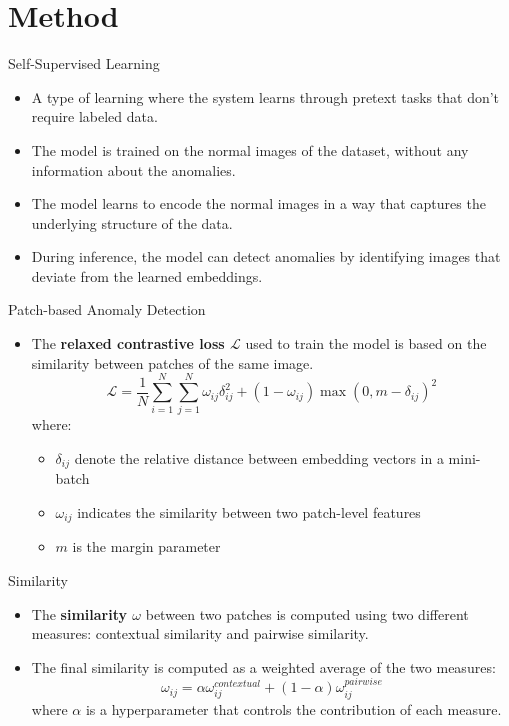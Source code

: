 \documentclass{beamer}
\begin{document}
\section{Method}
\begin{frame}{Self-Supervised Learning}
      \begin{itemize}
          \item A type of learning where the system learns through
           pretext tasks that don't require labeled data.
              \item The model is trained on the normal images of the dataset, without
               any information about the anomalies.
                  \item The model learns to encode the normal images in a way that
                   captures the underlying structure of the data.
                      \item During inference, the model can detect anomalies by
                       identifying images that deviate from the learned embeddings.
          \end{itemize}
  \end{frame}
\begin{frame}{Patch-based Anomaly Detection}
      \begin{itemize}
          \item The \textbf{relaxed contrastive loss $\mathcal{L}$} used to train the model is based on the similarity
           between patches of the same image.
           \begin{equation} \mathcal{L} = \frac{1}{N}\sum_{i=1}^{N} \sum_{j=1}^{N} 
            \omega_{ij}\delta_{ij}^2 + (1 - \omega_{ij})\max(0, m - \delta_{ij})^2
      \end{equation}
      where:
      \begin{itemize}
      \item $\delta_{ij}$ denote the relative distance between embedding vectors in a mini-batch
      \item $\omega_{ij}$ indicates the similarity between two patch-level features
      \item $m$ is the margin parameter
\end{itemize}
\end{itemize}
\end{frame}
\begin{frame}{Similarity}
      \begin{itemize}
              \item The \textbf{similarity $\omega$} between two patches is computed using two different
               measures: contextual similarity and pairwise similarity.
              \item The final similarity is computed as a weighted average of the two
               measures:
                  \begin{equation}
                         \omega_{ij} = \alpha\omega_{ij}^{contextual} + (1 - \alpha)\omega_{ij}^{pairwise}
                  \end{equation}
                  where $\alpha$ is a hyperparameter that controls the contribution of
                   each measure.
                  \end{itemize}
  \end{frame}
\end{document}
